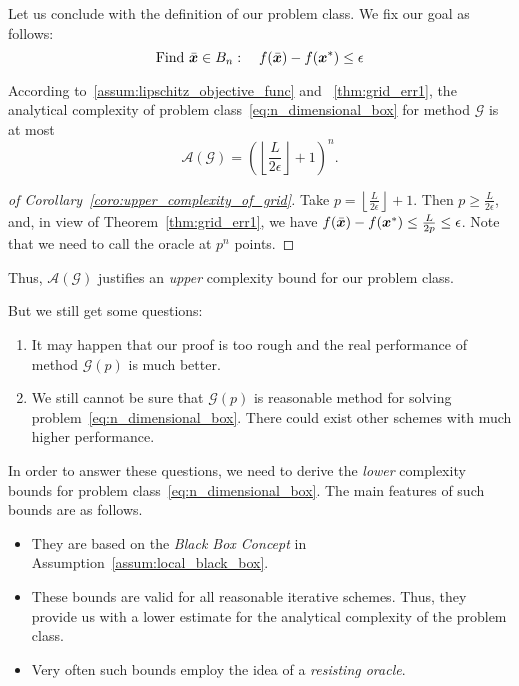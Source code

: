 Let us conclude with the definition of our problem class. We fix our goal as follows:
\begin{equation}\label{eq:goal_n_box}
    \text{Find} ~ \bar{\bm{x}} \in B_n : \quad f(\bar{\bm{x}}) - f(\bm{x}^*) \le \epsilon
\end{equation}

\begin{coro}\label{coro:upper_complexity_of_grid}
    According to~\ref{assum:lipschitz_objective_func} and
    ~\ref{thm:grid_err1}, the analytical complexity of problem 
    class~\ref{eq:n_dimensional_box} for method \(\mathscr{G}\) is at most
    \[
        \mathscr{A}(\mathscr{G}) = \left( \left\lfloor \frac{L}{2\epsilon} \right\rfloor +1 \right)^n .
    \]
\end{coro}

\begin{proof}[of Corollary~\ref{coro:upper_complexity_of_grid}]
    Take \(p = \left\lfloor \frac{L}{2\epsilon} \right\rfloor +1\). Then \(p \ge \frac{L}{2\epsilon}\), and, in view of Theorem~\ref{thm:grid_err1}, 
    we have \(f(\bar{\bm{x}}) - f(\bm{x}^*) \le \frac{L}{2p} \le \epsilon\). Note that we need to call the oracle at \(p^n\) points.
\end{proof}

Thus, \(\mathscr{A}(\mathscr{G})\) justifies an \emph{upper} complexity bound for our problem class.

But we still get some questions:
\begin{enumerate}
    \item It may happen that our proof is too rough and the real performance of method \(\mathscr{G}(p)\) is much better.
    \item We still cannot be sure that \(\mathscr{G}(p)\) is reasonable method for solving problem~\ref{eq:n_dimensional_box}. There could exist other schemes with much higher performance.
\end{enumerate}
In order to answer these questions, we need to derive the \emph{lower} complexity bounds for problem class~\ref{eq:n_dimensional_box}. The main features of such bounds are as follows.
\begin{itemize}
    \item They are based on the \emph{Black Box Concept} in Assumption~\ref{assum:local_black_box}.
    \item These bounds are valid for all reasonable iterative schemes. Thus, they provide us with a lower estimate for the analytical complexity of the problem class.
    \item Very often such bounds employ the idea of a \emph{resisting oracle}.
\end{itemize}


